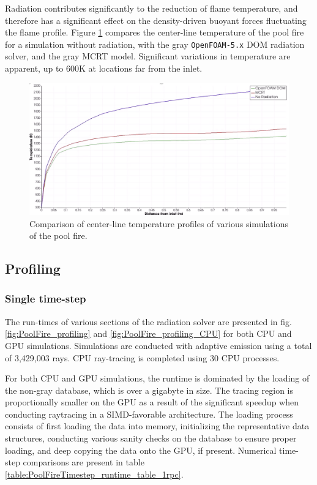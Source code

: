Radiation contributes significantly to the reduction of flame temperature, and therefore has a significant effect on the density-driven buoyant forces fluctuating the flame profile. 
Figure \ref{fig:PoolFire_withandwithoutrad} compares the center-line temperature of the pool fire for a simulation without radiation, with the gray \verb|OpenFOAM-5.x| DOM radiation solver, and the gray MCRT model. Significant variations in temperature are apparent, up to $600$K at locations far from the inlet.


\begin{figure}
\centering
\includegraphics[width=1\linewidth]{figures/ch4/PoolFire_WithandWithoutRadiation.png}
\caption{Comparison of center-line temperature profiles of various simulations of the pool fire.}
\label{fig:PoolFire_withandwithoutrad}
\end{figure}

\subsection{Profiling}
\subsubsection{Single time-step}
The run-times of various sections of the radiation solver are presented in fig. \ref{fig:PoolFire_profiling} and \ref{fig:PoolFire_profiling_CPU} for both CPU and GPU simulations. Simulations are conducted with adaptive emission using a total of 3,429,003 rays.
CPU ray-tracing is completed using 30 CPU processes. 

For both CPU and GPU simulations, the runtime is dominated by the loading of the non-gray database, which is over a gigabyte in size. 
The tracing region is proportionally smaller on the GPU as a result of the significant speedup when conducting raytracing in a SIMD-favorable architecture.
The loading process consists of first loading the data into memory, initializing the representative data structures, conducting various sanity checks on the database to ensure proper loading, and deep copying the data onto the GPU, if present.
Numerical time-step comparisons are present in table \ref{table:PoolFireTimestep_runtime_table_1rpc}.

